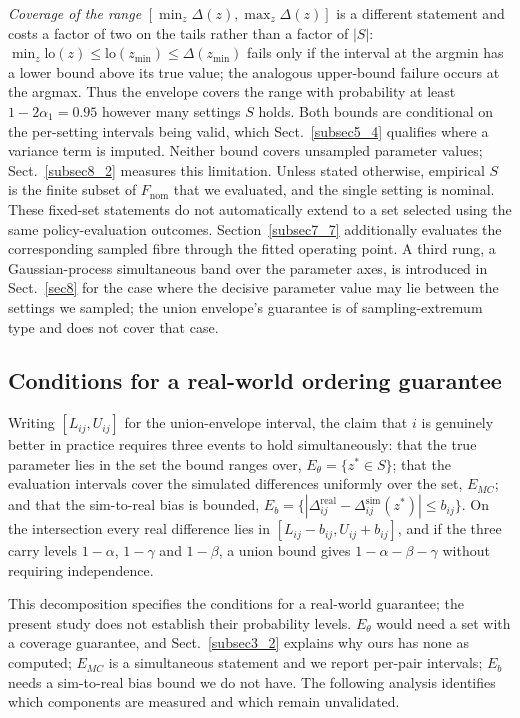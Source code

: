 \documentclass[pdflatex,iicol,sn-apa]{sn-jnl}
\theoremstyle{remark}
\begin{document}
\emph{Coverage of the range} $[\min_z \Delta(z), \max_z \Delta(z)]$ is a different statement and
costs a factor of two on the tails rather than a factor of $|S|$:
$\min_z \mathrm{lo}(z) \le \mathrm{lo}(z_{\min}) \le \Delta(z_{\min})$ fails only if the interval at
the argmin has a lower bound above its true value; the analogous upper-bound failure occurs
at the argmax. Thus the envelope covers the range with
probability at least $1 - 2\alpha_1 = 0.95$ however many settings $S$ holds. Both bounds are
conditional on the per-setting intervals being valid, which Sect.~\ref{subsec5_4} qualifies where a
variance term is imputed. Neither bound covers unsampled parameter values; Sect.~\ref{subsec8_2}
measures this limitation.
Unless stated otherwise, empirical $S$ is the finite subset of $F_{\mathrm{nom}}$ that we evaluated,
and the single setting is nominal. These fixed-set statements do not automatically extend to a set
selected using the same policy-evaluation outcomes. Section~\ref{subsec7_7} additionally evaluates the corresponding
sampled fibre through the fitted operating point.
A third rung, a Gaussian-process simultaneous band over the parameter axes, is introduced in
Sect.~\ref{sec8} for the case where the decisive parameter value may lie between the settings
we sampled; the union envelope's guarantee is of sampling-extremum type and does not cover that case.

\subsection{Conditions for a real-world ordering guarantee}\label{subsec3_4}

Writing $[L_{ij}, U_{ij}]$ for the union-envelope interval, the claim that $i$ is genuinely better in
practice requires three events to hold simultaneously: that the true parameter lies in the set the
bound ranges over, $E_\theta = \{z^* \in S\}$; that the evaluation intervals cover the simulated
differences uniformly over the set, $E_{MC}$; and that the sim-to-real bias is bounded,
$E_b = \{|\Delta^{\mathrm{real}}_{ij} - \Delta^{\mathrm{sim}}_{ij}(z^*)| \le b_{ij}\}$. On the
intersection every real difference lies in $[L_{ij} - b_{ij}, U_{ij} + b_{ij}]$, and if the
three carry levels $1-\alpha$, $1-\gamma$ and $1-\beta$, a union bound gives
$1 - \alpha - \beta - \gamma$ without requiring independence.

This decomposition specifies the conditions for a real-world guarantee; the present study does
not establish their probability levels. $E_\theta$ would need a set with a coverage guarantee, and Sect.~\ref{subsec3_2}
explains why ours has none as computed; $E_{MC}$ is a simultaneous statement and we report per-pair
intervals; $E_b$ needs a sim-to-real bias bound we do not have. The following analysis identifies which components are measured and which remain unvalidated.
\end{document}
